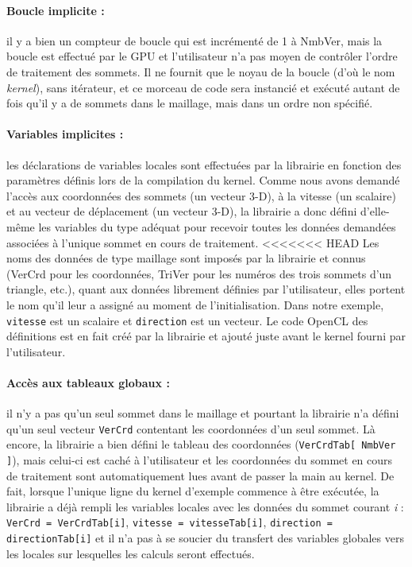 \documentclass[a4paper,12pt]{article}
\begin{document}
\paragraph{Boucle implicite : } il y a bien un compteur de boucle qui est incrémenté de 1 à NmbVer, mais la boucle est effectué par le GPU et l'utilisateur n'a pas moyen de contrôler l'ordre de traitement des sommets.
Il ne fournit que le noyau de la boucle (d'où le nom \emph{kernel}), sans itérateur, et ce morceau de code sera instancié et exécuté autant de fois qu'il y a de sommets dans le maillage, mais dans un ordre non spécifié.

\paragraph{Variables implicites : } les déclarations de variables locales sont effectuées par la librairie en fonction des paramètres définis lors de la compilation du kernel.
Comme nous avons demandé l'accès aux coordonnées des sommets (un vecteur 3-D), à la vitesse (un scalaire) et au vecteur de déplacement (un vecteur 3-D), la librairie a donc défini d'elle-même les variables du type adéquat pour recevoir toutes les données demandées associées à l'unique sommet en cours de traitement.
<<<<<<< HEAD
Les noms des données de type maillage sont imposés par la librairie et connus (VerCrd pour les coordonnées, TriVer pour les numéros des trois sommets d'un triangle, etc.), quant aux données librement définies par l'utilisateur, elles portent le nom qu'il leur a assigné au moment de l'initialisation.
Dans notre exemple, {\tt vitesse} est un scalaire et {\tt direction} est un vecteur. Le code OpenCL des définitions est en fait créé par la librairie et ajouté juste avant le kernel fourni par l'utilisateur.

\paragraph{Accès aux tableaux globaux : } il n'y a pas qu'un seul sommet dans le maillage et pourtant la librairie n'a défini qu'un seul vecteur {\tt VerCrd} contentant les coordonnées d'un seul sommet.
Là encore, la librairie a bien défini le tableau des coordonnées ({\tt VerCrdTab[ NmbVer ]}), mais celui-ci est caché à l'utilisateur et les coordonnées du sommet en cours de traitement sont automatiquement lues avant de passer la main au kernel.
De fait, lorsque l'unique ligne du kernel d'exemple commence à être exécutée, la librairie a déjà rempli les variables locales avec les données du sommet courant \emph{i} : {\tt VerCrd = VerCrdTab[i]}, {\tt vitesse = vitesseTab[i]}, {\tt direction = directionTab[i]} et il n'a pas à se soucier du transfert des variables globales vers les locales sur lesquelles les calculs seront effectués.
\end{document}

